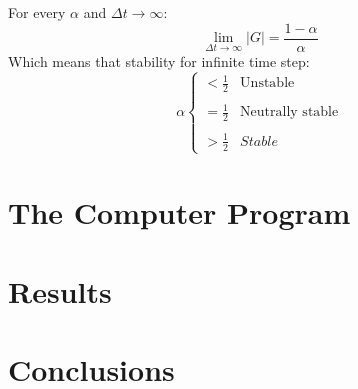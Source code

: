\documentclass[11pt, a4paper]{article}
\begin{document}
For every $\alpha$ and $\Delta t\rightarrow\infty$:
\begin{equation}
    \lim_{\Delta t\rightarrow\infty}\left|G\right|=\frac{1-\alpha}{\alpha}
\end{equation}
Which means that stability for infinite time step:
\begin{equation}
    \alpha \left\{\begin{matrix}
        \displaystyle<\frac{1}{2} & \text{Unstable} \\\\
        \displaystyle=\frac{1}{2} & \text{Neutrally stable} \\\\
        \displaystyle>\frac{1}{2} & Stable
    \end{matrix}\right.
\end{equation}



\newpage

\section{The Computer Program}
\newpage

\section{Results}
\newpage

\section{Conclusions}
\newpage
\end{document}

